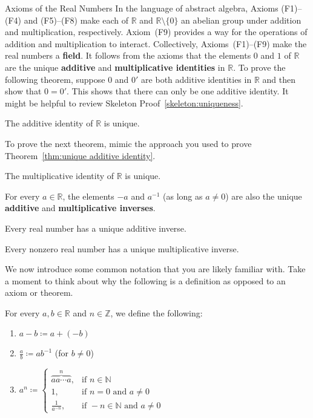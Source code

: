 \begin{section}{Axioms of the Real Numbers}
In the language of abstract algebra, Axioms (F1)--(F4) and (F5)--(F8) make each of $\mathbb{R}$ and $\mathbb{R}\setminus\{0\}$ an abelian group under addition and multiplication, respectively. Axiom~(F9) provides a way for the operations of addition and multiplication to interact.  Collectively, Axioms~(F1)--(F9) make the real numbers a \textbf{field}.  It follows from the axioms that the elements $0$ and $1$ of $\mathbb{R}$ are the unique \textbf{additive} and \textbf{multiplicative identities} in $\mathbb{R}$. To prove the following theorem, suppose $0$ and $0'$ are both additive identities in $\mathbb{R}$ and then show that $0=0'$. This shows that there can only be one additive identity. It might be helpful to review Skeleton Proof~\ref{skeleton:uniqueness}. 

\begin{theorem}\label{thm:unique additive identity}
The additive identity of $\mathbb{R}$ is unique.
\end{theorem}

To prove the next theorem, mimic the approach you used to prove Theorem~\ref{thm:unique additive identity}.

\begin{theorem}\label{thm:unique multiplicative identity}
The multiplicative identity of $\mathbb{R}$ is unique.
\end{theorem}

For every $a\in\mathbb{R}$, the elements $-a$ and $a^{-1}$ (as long as $a\neq 0$) are also the unique \textbf{additive} and \textbf{multiplicative inverses}. 

\begin{theorem}
Every real number has a unique additive inverse.
\end{theorem}

\begin{theorem}
Every nonzero real number has a unique multiplicative inverse.
\end{theorem}

We now introduce some common notation that you are likely familiar with.  Take a moment to think about why the following is a definition as opposed to an axiom or theorem.

\begin{definition}
For every $a,b\in\mathbb{R}$ and $n\in\mathbb{Z}$, we define the following:
\begin{enumerate}[label=\textrm{(\alph*)}]
\item $\boxed{a-b\coloneqq a+(-b)}$
\item $\boxed{\displaystyle\frac{a}{b}\coloneqq ab^{-1}}$ (for $b\neq 0$)
\item $\boxed{\displaystyle a^n\coloneqq \begin{cases}
\overbrace{aa\cdots a}^n, &\text{if }n\in \mathbb{N}\\
1, & \text{if }n=0\text{ and }a\neq 0\\
\displaystyle\frac{1}{a^{-n}}, & \text{if }-n\in \mathbb{N}\text{ and }a\neq 0
\end{cases}}$
\end{enumerate}
\end{definition}


\end{section}
